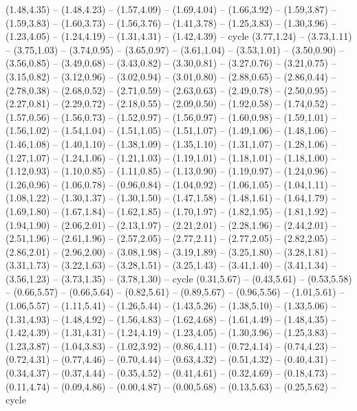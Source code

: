 \expandafter\def\csname geo:gebiet:1945-Luxembourg\endcsname{
  (1.48,4.35) -- (1.48,4.23) -- (1.57,4.09) -- (1.69,4.04) -- (1.66,3.92) -- (1.59,3.87) -- (1.59,3.83) -- (1.60,3.73) -- (1.56,3.76) -- (1.41,3.78) -- (1.25,3.83) -- (1.30,3.96) -- (1.23,4.05) -- (1.24,4.19) -- (1.31,4.31) -- (1.42,4.39) -- cycle}
\expandafter\def\csname geo:gebiet:1945-Switzerland\endcsname{
  (3.77,1.24) -- (3.73,1.11) -- (3.75,1.03) -- (3.74,0.95) -- (3.65,0.97) -- (3.61,1.04) -- (3.53,1.01) -- (3.50,0.90) -- (3.56,0.85) -- (3.49,0.68) -- (3.43,0.82) -- (3.30,0.81) -- (3.27,0.76) -- (3.21,0.75) -- (3.15,0.82) -- (3.12,0.96) -- (3.02,0.94) -- (3.01,0.80) -- (2.88,0.65) -- (2.86,0.44) -- (2.78,0.38) -- (2.68,0.52) -- (2.71,0.59) -- (2.63,0.63) -- (2.49,0.78) -- (2.50,0.95) -- (2.27,0.81) -- (2.29,0.72) -- (2.18,0.55) -- (2.09,0.50) -- (1.92,0.58) -- (1.74,0.52) -- (1.57,0.56) -- (1.56,0.73) -- (1.52,0.97) -- (1.56,0.97) -- (1.60,0.98) -- (1.59,1.01) -- (1.56,1.02) -- (1.54,1.04) -- (1.51,1.05) -- (1.51,1.07) -- (1.49,1.06) -- (1.48,1.06) -- (1.46,1.08) -- (1.40,1.10) -- (1.38,1.09) -- (1.35,1.10) -- (1.31,1.07) -- (1.28,1.06) -- (1.27,1.07) -- (1.24,1.06) -- (1.21,1.03) -- (1.19,1.01) -- (1.18,1.01) -- (1.18,1.00) -- (1.12,0.93) -- (1.10,0.85) -- (1.11,0.85) -- (1.13,0.90) -- (1.19,0.97) -- (1.24,0.96) -- (1.26,0.96) -- (1.06,0.78) -- (0.96,0.84) -- (1.04,0.92) -- (1.06,1.05) -- (1.04,1.11) -- (1.08,1.22) -- (1.30,1.37) -- (1.30,1.50) -- (1.47,1.58) -- (1.48,1.61) -- (1.64,1.79) -- (1.69,1.80) -- (1.67,1.84) -- (1.62,1.85) -- (1.70,1.97) -- (1.82,1.95) -- (1.81,1.92) -- (1.94,1.90) -- (2.06,2.01) -- (2.13,1.97) -- (2.21,2.01) -- (2.28,1.96) -- (2.44,2.01) -- (2.51,1.96) -- (2.61,1.96) -- (2.57,2.05) -- (2.77,2.11) -- (2.77,2.05) -- (2.82,2.05) -- (2.86,2.01) -- (2.96,2.00) -- (3.08,1.98) -- (3.19,1.89) -- (3.25,1.80) -- (3.28,1.81) -- (3.31,1.73) -- (3.22,1.63) -- (3.28,1.51) -- (3.25,1.43) -- (3.41,1.40) -- (3.41,1.34) -- (3.56,1.23) -- (3.73,1.35) -- (3.78,1.30) -- cycle}
\expandafter\def\csname geo:gebiet:1945-Belgium\endcsname{
  (0.31,5.67) -- (0.43,5.61) -- (0.53,5.58) -- (0.66,5.57) -- (0.66,5.64) -- (0.82,5.61) -- (0.89,5.67) -- (0.96,5.56) -- (1.01,5.61) -- (1.06,5.57) -- (1.11,5.41) -- (1.26,5.44) -- (1.43,5.26) -- (1.38,5.10) -- (1.33,5.06) -- (1.31,4.93) -- (1.48,4.92) -- (1.56,4.83) -- (1.62,4.68) -- (1.61,4.49) -- (1.48,4.35) -- (1.42,4.39) -- (1.31,4.31) -- (1.24,4.19) -- (1.23,4.05) -- (1.30,3.96) -- (1.25,3.83) -- (1.23,3.87) -- (1.04,3.83) -- (1.02,3.92) -- (0.86,4.11) -- (0.72,4.14) -- (0.74,4.23) -- (0.72,4.31) -- (0.77,4.46) -- (0.70,4.44) -- (0.63,4.32) -- (0.51,4.32) -- (0.40,4.31) -- (0.34,4.37) -- (0.37,4.44) -- (0.35,4.52) -- (0.41,4.61) -- (0.32,4.69) -- (0.18,4.73) -- (0.11,4.74) -- (0.09,4.86) -- (0.00,4.87) -- (0.00,5.68) -- (0.13,5.63) -- (0.25,5.62) -- cycle}
